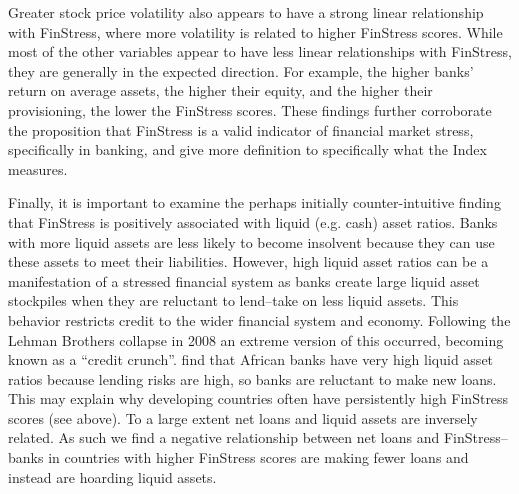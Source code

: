 \documentclass[]{article}
\begin{document}
Greater stock price volatility also appears to have a strong linear relationship with FinStress, where more volatility is related to higher FinStress scores. While most of the other variables appear to have less linear relationships with FinStress, they are generally in the expected direction. For example, the higher banks' return on average assets, the higher their equity, and the higher their provisioning, the lower the FinStress scores. These findings further corroborate the proposition that FinStress is a valid indicator of financial market stress, specifically in banking, and give more definition to specifically what the Index measures.

Finally, it is important to examine the perhaps initially counter-intuitive finding that FinStress is positively associated with liquid (e.g. cash) asset ratios. Banks with more liquid assets are less likely to become insolvent because they can use these assets to meet their liabilities. However, high liquid asset ratios can be a manifestation of a stressed financial system as banks create large liquid asset stockpiles when they are reluctant to lend--take on less liquid assets. This behavior restricts credit to the wider financial system and economy. Following the Lehman Brothers collapse in 2008 an extreme version of this occurred, becoming known as a ``credit crunch''. \cite{Andrianova2014} find that African banks have very high liquid asset ratios because lending risks are high, so banks are reluctant to make new loans. This may explain why developing countries often have persistently high FinStress scores (see above). To a large extent net loans and liquid assets are inversely related. As such we find a negative relationship between net loans and FinStress--banks in countries with higher FinStress scores are making fewer loans and instead are hoarding liquid assets.
\end{document}
